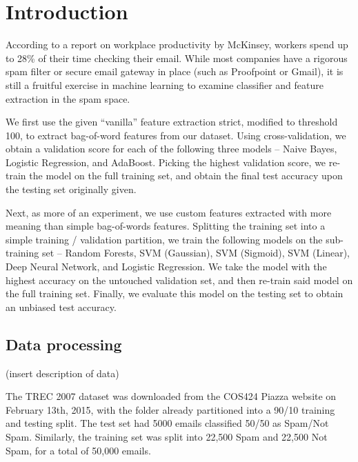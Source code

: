 \documentclass{article} %
\begin{document}
\section{Introduction}
According to a report on workplace productivity by McKinsey, workers spend up to 28\% of their time checking their email.  While most companies have a rigorous spam filter or secure email gateway in place (such as Proofpoint or Gmail), it is still a fruitful exercise in machine learning to examine classifier and feature extraction in the spam space.\par 
We first use the given ``vanilla'' feature extraction strict, modified to threshold 100, to extract bag-of-word features from our dataset.  Using cross-validation, we obtain a validation score for each of the following three models -- Naive Bayes, Logistic Regression, and AdaBoost.  Picking the highest validation score, we re-train the model on the full training set, and obtain the final test accuracy upon the testing set originally given.\par 
Next, as more of an experiment, we use custom features extracted with more meaning than simple bag-of-words features.  Splitting the training set into a simple training / validation partition, we train the following models on the sub-training set -- Random Forests, SVM (Gaussian), SVM (Sigmoid), SVM (Linear), Deep Neural Network, and Logistic Regression.  We take the model with the highest accuracy on the untouched validation set, and then re-train said model on the full training set.  Finally, we evaluate this model on the testing set to obtain an unbiased test accuracy.
%
\subsection{Data processing}
(insert description of data)\par
The TREC 2007 dataset was downloaded from the COS424 Piazza website on February 13th, 2015, with the folder already partitioned into a 90/10 training and testing split. The test set had 5000 emails classified 50/50 as Spam/Not Spam. Similarly, the training set was split into 22,500 Spam and 22,500 Not Spam, for a total of 50,000 emails. 
\end{document}
